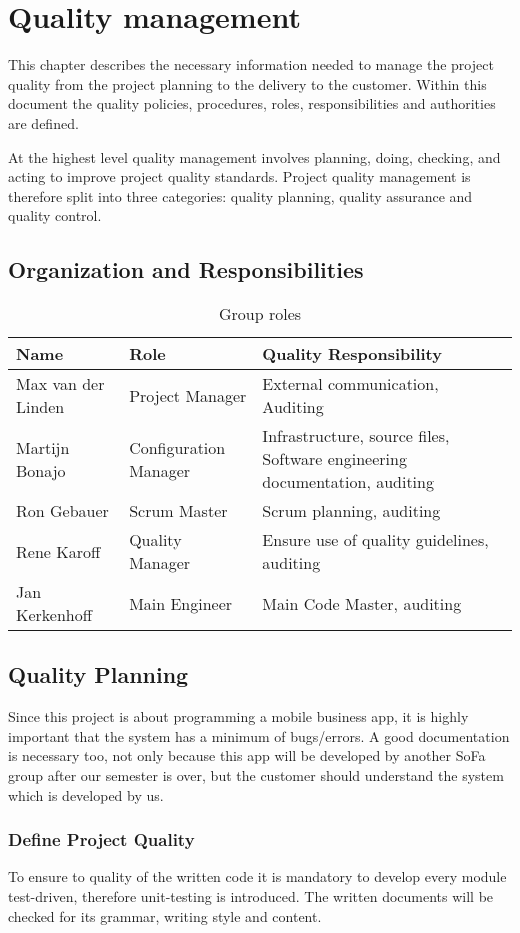 \section{Quality management}
This chapter describes the necessary information needed to manage the project quality from the project planning to the delivery
to the customer. Within this document the quality policies, procedures, roles, responsibilities and authorities are defined.

At the highest level quality management involves planning, doing, checking, and acting to improve project quality standards. Project quality management is therefore split into three categories: quality planning, quality assurance and quality control.
\subsection{Organization and Responsibilities}
\begin{table}[htbp]
	\begin{tabular}{ p{4cm} p{3.5cm} p{6cm} }
		\textbf{Name} & \textbf{Role} & \textbf{Quality Responsibility} \\ \hline
		Max van der Linden & Project Manager & External communication, Auditing \\
		Martijn Bonajo & Configuration Manager & Infrastructure, source files, Software engineering documentation, auditing \\
		Ron Gebauer & Scrum Master & Scrum planning, auditing \\
		Rene Karoff & Quality Manager & Ensure use of quality guidelines, auditing \\
		Jan Kerkenhoff & Main Engineer & Main Code Master, auditing \\
	\end{tabular}
	\caption{Group roles\label{tab:GroupRoles}}
\end{table}

\subsection{Quality Planning}
Since this project is about programming a mobile business \gls{app}, it is highly important that the system has a minimum of bugs/errors. A good documentation is necessary too, not only because this \gls{app} will be developed by another SoFa group after our semester is over, but the customer should understand the system which is developed by us.
\subsubsection{Define Project Quality}
To ensure to quality of the written code it is mandatory to develop every module test-driven, therefore unit-testing is introduced. The written documents will be checked for its grammar, writing style and content.
